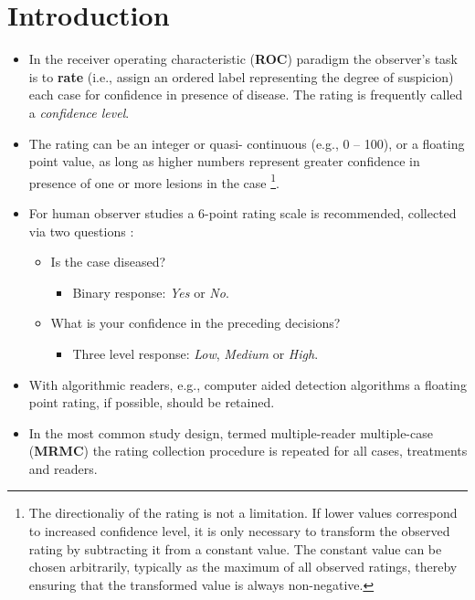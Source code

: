 \documentclass[]{book}
\providecommand{\tightlist}{%
  \setlength{\itemsep}{0pt}\setlength{\parskip}{0pt}}
\let\rmarkdownfootnote\footnote%
\def\footnote{\protect\rmarkdownfootnote}
\begin{document}
\hypertarget{introduction}{%
\section{Introduction}\label{introduction}}

\begin{itemize}
\tightlist
\item
  In the receiver operating characteristic (\textbf{ROC}) paradigm \citep{RN1766} the observer's task is to \textbf{rate} (i.e., assign an ordered label representing the degree of suspicion) each case for confidence in presence of disease. The rating is frequently called a \emph{confidence level}.
\item
  The rating can be an integer or quasi- continuous (e.g., 0 -- 100), or a floating point value, as long as higher numbers represent greater confidence in presence of one or more lesions in the case \footnote{The directionaliy of the rating is not a limitation. If lower values correspond to increased confidence level, it is only necessary to transform the observed rating by subtracting it from a constant value. The constant value can be chosen arbitrarily, typically as the maximum of all observed ratings, thereby ensuring that the transformed value is always non-negative.}.
\item
  For human observer studies a 6-point rating scale is recommended, collected via two questions \citep{RN2680}:

  \begin{itemize}
  \tightlist
  \item
    Is the case diseased?

    \begin{itemize}
    \tightlist
    \item
      Binary response: \emph{Yes} or \emph{No}.
    \end{itemize}
  \item
    What is your confidence in the preceding decisions?

    \begin{itemize}
    \tightlist
    \item
      Three level response: \emph{Low}, \emph{Medium} or \emph{High}.
    \end{itemize}
  \end{itemize}
\item
  With algorithmic readers, e.g., computer aided detection algorithms a floating point rating, if possible, should be retained.
\item
  In the most common study design, termed multiple-reader multiple-case (\textbf{MRMC}) the rating collection procedure is repeated for all cases, treatments and readers.
\end{itemize}
\end{document}
